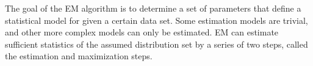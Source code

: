 \documentclass[11pt]{article}
\begin{document}
The goal of the EM algorithm is to determine a set of parameters that define a statistical model for given a certain data set.   %
Some estimation models are trivial, and other more complex models can only be estimated. 
EM can estimate sufficient statistics of the assumed distribution set by a series of two steps, called the estimation and maximization steps. 
\end{document}
